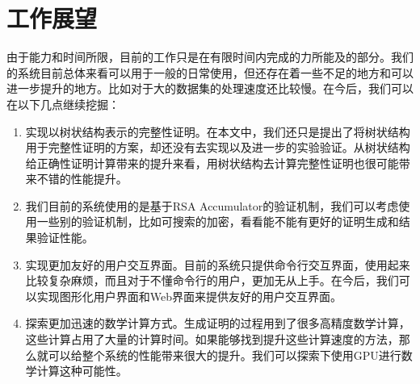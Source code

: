 \section{工作展望}
由于能力和时间所限，目前的工作只是在有限时间内完成的力所能及的部分。我们的系统目前总体来看可以用于一般的日常使用，但还存在着一些不足的地方和可以进一步提升的地方。比如对于大的数据集的处理速度还比较慢。在今后，我们可以在以下几点继续挖掘：
\begin{enumerate}
\item 实现以树状结构表示的完整性证明。在本文中，我们还只是提出了将树状结构用于完整性证明的方案，却还没有去实现以及进一步的实验验证。从树状结构给正确性证明计算带来的提升来看，用树状结构去计算完整性证明也很可能带来不错的性能提升。
\item 我们目前的系统使用的是基于RSA Accumulator的验证机制，我们可以考虑使用一些别的验证机制，比如可搜索的加密，看看能不能有更好的证明生成和结果验证性能。
\item 实现更加友好的用户交互界面。目前的系统只提供命令行交互界面，使用起来比较复杂麻烦，而且对于不懂命令行的用户，更加无从上手。在今后，我们可以实现图形化用户界面和Web界面来提供友好的用户交互界面。
\item 探索更加迅速的数学计算方式。生成证明的过程用到了很多高精度数学计算，这些计算占用了大量的计算时间。如果能够找到提升这些计算速度的方法，那么就可以给整个系统的性能带来很大的提升。我们可以探索下使用GPU进行数学计算这种可能性。
\end{enumerate}
